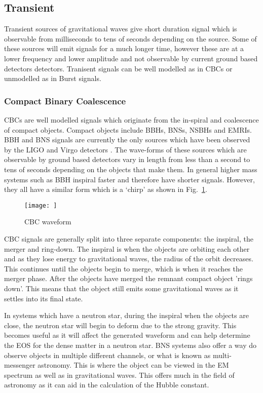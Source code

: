 \subsection{\label{sources:transient} Transient}

Transient sources of gravitational waves give short duration signal which is observable from milliseconds to tens of seconds depending on the source. 
Some of these sources will emit signals for a much longer time, however these are at a lower frequency and lower amplitude and not observable by current ground based detectors detectors.
Tranisent signals can be well modelled as in \acp{CBC} or unmodelled as in Burst signals.

\subsubsection{\label{sources:transient:cbc} Compact Binary Coalescence}

\acp{CBC} are well modelled signals which originate from the in-spiral and coalescence of compact objects. 
Compact objects include \acp{BBH}, \acp{BNS}, \acp{NSBH} and \acp{EMRI}.
\ac{BBH} and \ac{BNS} signals are currently the only sources which have been observed by the \ac{LIGO} and Virgo detectors \cite{}. 
The wave-forms of these sources which are observable by ground based detectors vary in length from less than a second to tens of seconds depending on the objects that make them.
In general higher mass systems such as \ac{BBH} inspiral faster and therefore have shorter signals.
However, they all have a similar form which is a `chirp' as shown in Fig.~\ref{sources:transient:cbc:wave}.

\begin{figure}[h]
    \centering
    \texttt{[image: ]}
    \caption{CBC waveform}
    \label{sources:transient:cbc:wave}
\end{figure}


\ac{CBC} signals are generally split into three separate components: the inspiral, the merger and ring-down. 
The inspiral is when the objects are orbiting each other and as they lose energy to gravitational waves, the radius of the orbit decreases.
This continues until the objects begin to merge, which is when it reaches the merger phase.
After the objects have merged the remnant compact object 'rings down'. This means that the object still emits some gravitational waves as it settles into its final state.

In systems which have a neutron star, during the inspiral when the objects are close, the neutron star will begin to deform due to the strong gravity. 
This becomes useful as it will affect the generated waveform and can help determine the \ac{EOS} for the dense matter in a neutron star.
\ac{BNS} systems also offer a way do observe objects in multiple different channels, or what is known as multi-messenger astronomy. 
This is where the object can be viewed in the \ac{EM} spectrum as well as in gravitational waves.
This offers much in the field of astronomy as it can aid in the calculation of the Hubble constant. 


